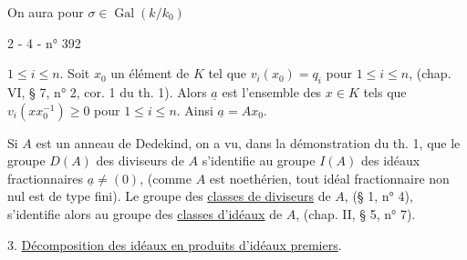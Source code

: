  On aura  pour $\sigma\in\operatorname{Gal}(k/k_0)$


2 - 4 - \hfill n° 392

$1\le i\le n$. Soit $x_0$ un élément de $K$ tel que $v_i(x_0)=q_i$ pour $1\le i\le n$, (chap. VI, § 7, n° 2, cor. 1 du th. 1). Alors $\underline a$ est l'ensemble des $x\in K$ tels que $v_i(xx_0^{-1})\ge0$ pour $1\le i\le n$. Ainsi $\underline a=Ax_0$.

Si $A$ est un anneau de Dedekind, on a vu, dans la démonstration du th. 1, que le groupe $D(A)$ des diviseurs de $A$ s'identifie au groupe $I(A)$ des idéaux fractionnaires $\underline a\ne(0)$, (comme $A$ est noethérien, tout idéal fractionnaire non nul est de type fini). Le groupe des \uline{classes de diviseurs} de $A$, (§ 1, n° 4), s'identifie alors au groupe des \uline{classes d'idéaux} de $A$, (chap. II, § 5, n° 7).

3. \uline{Décomposition des idéaux en produits d'idéaux premiers}.

